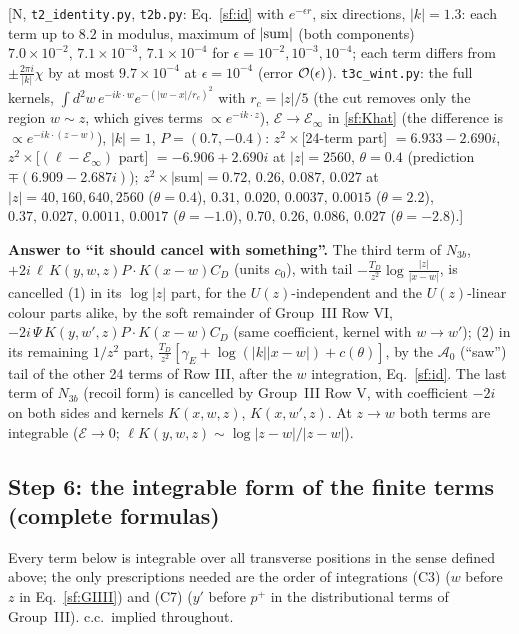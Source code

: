 [N, \texttt{t2\_identity.py}, \texttt{t2b.py}: Eq.~\eqref{sf:id} with $e^{-\epsilon r}$, six directions, $|k|=1.3$: each term up to $8.2$ in modulus, maximum of $|{\rm sum}|$ (both components) $7.0\times10^{-2},\,7.1\times10^{-3},\,7.1\times10^{-4}$ for $\epsilon=10^{-2},10^{-3},10^{-4}$; each term differs from $\pm\frac{2\pi i}{|k|}\chi$ by at most $9.7\times10^{-4}$ at $\epsilon=10^{-4}$ (error ${\cal O}(\epsilon)$). \texttt{t3c\_wint.py}: the full kernels, $\int d^{2}w\,e^{-ik\cdot w}e^{-(|w-x|/r_{c})^{2}}$ with $r_{c}=|z|/5$ (the cut removes only the region $w\sim z$, which gives terms $\propto e^{-ik\cdot z}$), $\mathcal{E}\to\mathcal{E}_{\infty}$ in \eqref{sf:Khat} (the difference is $\propto e^{-ik\cdot(z-w)}$), $|k|=1$, $P=(0.7,-0.4)$: $z^{2}\times$[24-term part] $=6.933-2.690i$, $z^{2}\times$[$(\ell-\mathcal{E}_{\infty})$ part] $=-6.906+2.690i$ at $|z|=2560$, $\theta=0.4$ (prediction $\mp(6.909-2.687i)$); $z^{2}\times|$sum$|=0.72,\,0.26,\,0.087,\,0.027$ at $|z|=40,160,640,2560$ ($\theta=0.4$), $0.31,\,0.020,\,0.0037,\,0.0015$ ($\theta=2.2$), $0.37,\,0.027,\,0.0011,\,0.0017$ ($\theta=-1.0$), $0.70,\,0.26,\,0.086,\,0.027$ ($\theta=-2.8$).]

\noindent\textbf{Answer to ``it should cancel with something''.} The third term of $N_{3b}$, $+2i\,\ell\,K(y,w,z)P\!\cdot\!K(x-w)C_{D}$ (units $c_{0}$), with tail $-\frac{T_{D}}{z^{2}}\log\frac{|z|}{|x-w|}$, is cancelled (1) in its $\log|z|$ part, for the $U(z)$-independent and the $U(z)$-linear colour parts alike, by the soft remainder of Group~III Row VI, $-2i\,\Psi\,K(y,w',z)P\!\cdot\!K(x-w)C_{D}$ (same coefficient, kernel with $w\to w'$); (2) in its remaining $1/z^{2}$ part, $\frac{T_{D}}{z^{2}}[\gamma_{E}+\log(|k||x-w|)+c(\theta)]$, by the $\mathcal{A}_{0}$ (``saw'') tail of the other 24 terms of Row III, after the $w$ integration, Eq.~\eqref{sf:id}. The last term of $N_{3b}$ (recoil form) is cancelled by Group~III Row V, with coefficient $-2i$ on both sides and kernels $K(x,w,z)$, $K(x,w',z)$. At $z\to w$ both terms are integrable ($\mathcal{E}\to0$; $\ell K(y,w,z)\sim\log|z-w|/|z-w|$).

\subsection{Step 6: the integrable form of the finite terms (complete formulas)}
\noindent Every term below is integrable over all transverse positions in the sense defined above; the only prescriptions needed are the order of integrations (C3) ($w$ before $z$ in Eq.~\eqref{sf:GIIII}) and (C7) ($y'$ before $p^{+}$ in the distributional terms of Group~III). c.c.\ implied throughout.

